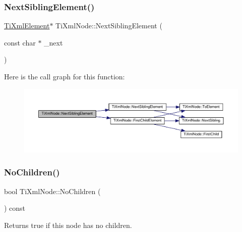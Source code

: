 \subsubsection{\texorpdfstring{Next\+Sibling\+Element()}{NextSiblingElement()}\hspace{0.1cm}{\footnotesize\ttfamily [4/4]}}
{\footnotesize\ttfamily \hyperlink{class_ti_xml_element}{Ti\+Xml\+Element}$\ast$ Ti\+Xml\+Node\+::\+Next\+Sibling\+Element (\begin{DoxyParamCaption}\item[{const char $\ast$}]{\+\_\+next }\end{DoxyParamCaption})\hspace{0.3cm}{\ttfamily [inline]}}

Here is the call graph for this function\+:
\nopagebreak
\begin{figure}[H]
\begin{center}
\leavevmode
\includegraphics[width=350pt]{class_ti_xml_node_a6e1ac6b800e18049bc75e9f8e63a8e5f_cgraph}
\end{center}
\end{figure}
\mbox{\label{class_ti_xml_node_abe85e0ec04ea59c033f324c8504653e5}} 
\subsubsection{\texorpdfstring{No\+Children()}{NoChildren()}}
{\footnotesize\ttfamily bool Ti\+Xml\+Node\+::\+No\+Children (\begin{DoxyParamCaption}{ }\end{DoxyParamCaption}) const\hspace{0.3cm}{\ttfamily [inline]}}



Returns true if this node has no children. 

\mbox{\label{class_ti_xml_node_ab643043132ffd794f8602685d34a982e}} 
